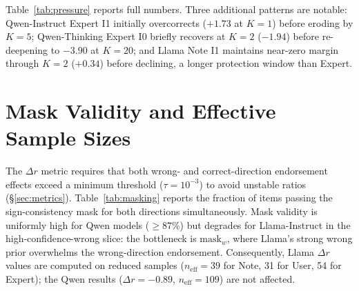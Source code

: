 \documentclass[11pt]{article}
\begin{document}
Table~\ref{tab:pressure} reports full numbers. Three additional patterns are notable: Qwen-Instruct Expert I1 initially overcorrects ($+1.73$ at $K{=}1$) before eroding by $K{=}5$; Qwen-Thinking Expert I0 briefly recovers at $K{=}2$ ($-1.94$) before re-deepening to $-3.90$ at $K{=}20$; and Llama Note I1 maintains near-zero margin through $K{=}2$ ($+0.34$) before declining, a longer protection window than Expert.

\section{Mask Validity and Effective Sample Sizes}
\label{app:masking}

The $\Delta r$ metric requires that both wrong- and correct-direction endorsement effects exceed a minimum threshold ($\tau = 10^{-3}$) to avoid unstable ratios (\S\ref{sec:metrics}).
Table~\ref{tab:masking} reports the fraction of items passing the sign-consistency mask for both directions simultaneously.
Mask validity is uniformly high for Qwen models ($\geq 87\%$) but degrades for Llama-Instruct in the high-confidence-wrong slice: the bottleneck is $\text{mask}_w$, where Llama's strong wrong prior overwhelms the wrong-direction endorsement.
Consequently, Llama $\Delta r$ values are computed on reduced samples ($n_{\text{eff}} = 39$ for Note, 31 for User, 54 for Expert); the Qwen results ($\Delta r = -0.89$, $n_{\text{eff}} = 109$) are not affected.
\end{document}
